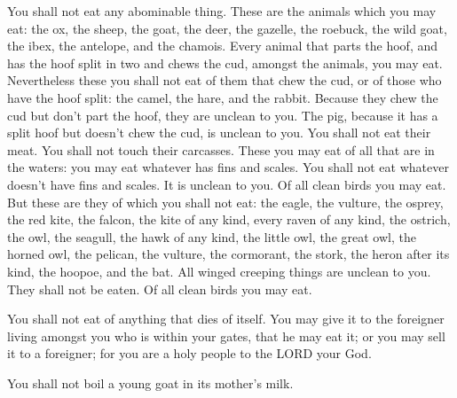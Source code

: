  You shall not eat any abominable thing.  These
are the animals which you may eat: the ox, the sheep, the goat,
 the deer, the gazelle, the roebuck, the wild goat, the
ibex, the antelope, and the chamois.  Every animal that
parts the hoof, and has the hoof split in two and chews the cud, amongst
the animals, you may eat.  Nevertheless these you shall not
eat of them that chew the cud, or of those who have the hoof split: the
camel, the hare, and the rabbit. Because they chew the cud but don't
part the hoof, they are unclean to you.  The pig, because it
has a split hoof but doesn't chew the cud, is unclean to you. You shall
not eat their meat. You shall not touch their carcasses. 
These you may eat of all that are in the waters: you may eat whatever
has fins and scales.  You shall not eat whatever doesn't
have fins and scales. It is unclean to you.  Of all clean
birds you may eat.  But these are they of which you shall
not eat: the eagle, the vulture, the osprey,  the red kite,
the falcon, the kite of any kind,  every raven of any kind,
 the ostrich, the owl, the seagull, the hawk of any kind,
 the little owl, the great owl, the horned owl,
 the pelican, the vulture, the cormorant,  the
stork, the heron after its kind, the hoopoe, and the bat. 
All winged creeping things are unclean to you. They shall not be eaten.
 Of all clean birds you may eat.

 You shall not eat of anything that dies of itself. You may
give it to the foreigner living amongst you who is within your gates,
that he may eat it; or you may sell it to a foreigner; for you are a
holy people to the LORD your God.

You shall not boil a young goat in its mother's milk.


